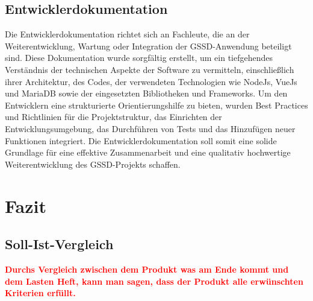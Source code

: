 \begin{flushleft}
\subsection{Entwicklerdokumentation}
Die Entwicklerdokumentation richtet sich an Fachleute, die an der Weiterentwicklung, Wartung oder Integration der \acs{GSSD}-Anwendung beteiligt sind. Diese Dokumentation wurde sorgfältig erstellt, um ein tiefgehendes Verständnis der technischen Aspekte der Software zu vermitteln, einschließlich ihrer Architektur, des Codes, der verwendeten Technologien wie NodeJs, VueJs und MariaDB sowie der eingesetzten Bibliotheken und Frameworks. Um den Entwicklern eine strukturierte Orientierungshilfe zu bieten, wurden Best Practices und Richtlinien für die Projektstruktur, das Einrichten der Entwicklungsumgebung, das Durchführen von Tests und das Hinzufügen neuer Funktionen integriert. Die Entwicklerdokumentation soll somit eine solide Grundlage für eine effektive Zusammenarbeit und eine qualitativ hochwertige Weiterentwicklung des \acs{GSSD}-Projekts schaffen.

\section{Fazit}
\subsection{Soll-\/Ist-Vergleich}
\textcolor{red}{\textbf{Durchs Vergleich zwischen dem Produkt was am Ende kommt und dem Lasten Heft, kann man sagen, dass der Produkt alle erwünschten Kriterien erf\"ullt.}}
\\
\end{flushleft}
